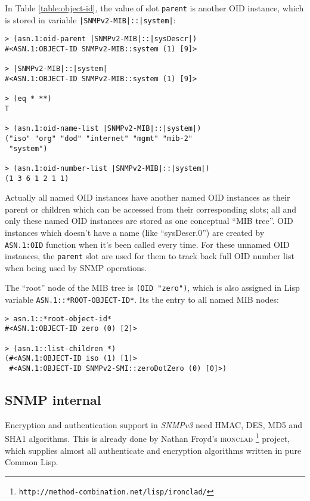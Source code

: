 \documentclass[reprint,natbib,9pt]{sigplanconf}
\begin{document}
In Table \ref{table:object-id}, the value of slot \texttt{parent}
is another OID instance, which is stored in variable
\texttt{|SNMPv2-MIB|::|system|}:

\begin{verbatim}
> (asn.1:oid-parent |SNMPv2-MIB|::|sysDescr|)
#<ASN.1:OBJECT-ID SNMPv2-MIB::system (1) [9]>

> |SNMPv2-MIB|::|system|
#<ASN.1:OBJECT-ID SNMPv2-MIB::system (1) [9]>

> (eq * **)
T

> (asn.1:oid-name-list |SNMPv2-MIB|::|system|)
("iso" "org" "dod" "internet" "mgmt" "mib-2"
 "system")

> (asn.1:oid-number-list |SNMPv2-MIB|::|system|)
(1 3 6 1 2 1 1)
\end{verbatim}

Actually all named OID instances have another
named OID instances as their parent or children which can be
accessed from their corresponding slots; all and only these named
OID instances are stored as one conceptual ``MIB tree''.
OID instances which doesn't have a name (like
``sysDescr.0'') are created by \texttt{ASN.1:OID} function when it's been called every time. For these unnamed OID instances, the \texttt{parent} slot are
used for them to track back full OID number list when being used by SNMP operations.

The ``root'' node of the MIB tree is \texttt{(OID "zero")}, which
is also assigned in Lisp variable \texttt{ASN.1::*ROOT-OBJECT-ID*}.
Its the entry to all named MIB nodes:

\begin{verbatim}
> asn.1::*root-object-id*
#<ASN.1:OBJECT-ID zero (0) [2]>

> (asn.1::list-children *)
(#<ASN.1:OBJECT-ID iso (1) [1]>
 #<ASN.1:OBJECT-ID SNMPv2-SMI::zeroDotZero (0) [0]>)
\end{verbatim}

\subsection{SNMP internal}

Encryption and authentication support in \textsl{SNMPv3} need HMAC,
DES, MD5 and SHA1 algorithms. This is already done by Nathan Froyd's \textsc{ironclad}%
\footnote{\texttt{http://method-combination.net/lisp/ironclad/}}
project, which supplies almost all authenticate and encryption
algorithms written in pure Common Lisp.
\end{document}
